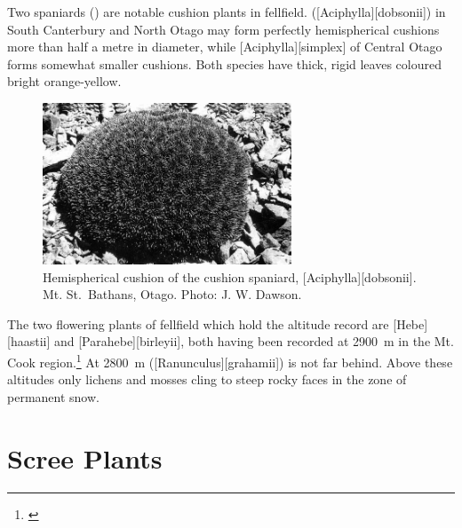 Two spaniards () are notable cushion plants in fellfield.
 ([Aciphylla][dobsonii]) in South Canterbury and North Otago may form perfectly hemispherical cushions more than half a metre in diameter, while [Aciphylla][simplex] of Central Otago forms somewhat smaller cushions.
Both species have thick, rigid leaves coloured bright orange-yellow.
\begin{figure}
	\centering
	\includegraphics[width=0.66\textwidth]{graphics/figure110cushion-spaniard.jpg}
	\caption[Hemispherical cushion of the cushion spaniard]{Hemispherical cushion of the cushion spaniard, [Aciphylla][dobsonii].
	Mt. St.\ Bathans, Otago.
	Photo: J. W. Dawson.}%
	\label{fig:110cushion-spaniard}
\end{figure}

The two flowering plants of fellfield which hold the altitude record are [Hebe][haastii] and  [Parahebe][birleyii], both having been recorded at \SI{2900}{\metre} in the Mt.
Cook region.\footnote{\cite{wilson1978wild}}
At \SI{2800}{\metre}  ([Ranunculus][grahamii]) is not far behind.
Above these altitudes only lichens and mosses cling to steep rocky faces in the zone of permanent snow.

\section{Scree Plants}

